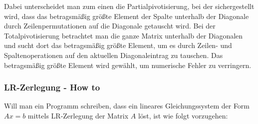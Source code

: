 \documentclass[a4paper,11pt]{article}
\theoremstyle{definition}
\begin{document}
Dabei unterscheidet man zum einen die Partialpivotisierung, bei der
sichergestellt wird, dass das betragsmäßig größte Element der Spalte
unterhalb der Diagonale durch Zeilenpermutationen auf die Diagonale
getauscht wird. Bei der Totalpivotisierung betrachtet man die ganze
Matrix unterhalb der Diagonalen und sucht dort das betragsmäßig größte
Element, um es durch Zeilen- und Spaltenoperationen auf den aktuellen
Diagonaleintrag zu tauschen. Das betragsmäßig größte Element wird
gewählt, um numerische Fehler zu verringern.

\subsubsection{LR-Zerlegung - How to}

Will man ein Programm schreiben, dass ein lineares Gleichungssystem
der Form $Ax=b$ mittels LR-Zerlegung der Matrix $A$ löst, ist wie
folgt vorzugehen:
\end{document}
